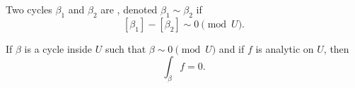 \begin{definition}
    Two cycles $\beta_1$ and $\beta_2$ are , denoted $\beta_1 \sim \beta_2$ if
    \[ [\beta_1] - [\beta_2] \sim 0 \pmod{U}. \]
\end{definition}

\begin{theorem}
    If $\beta$ is a cycle inside $U$ such that $\beta \sim 0
    \pmod{U}$ and if $f$ is analytic on $U$, then
    \[ \int_{\beta} f = 0. \]
\end{theorem}
